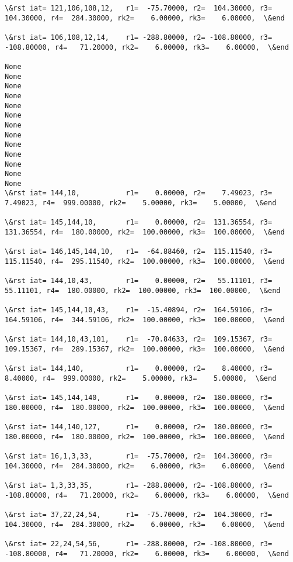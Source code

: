 \documentclass[11pt]{article}
\begin{document}
\begin{Verbatim}[commandchars=\\\{\}]
\&rst iat= 121,106,108,12,   r1=  -75.70000, r2=  104.30000, r3=  104.30000, r4=  284.30000, rk2=    6.00000, rk3=    6.00000,  \&end

\&rst iat= 106,108,12,14,    r1= -288.80000, r2= -108.80000, r3= -108.80000, r4=   71.20000, rk2=    6.00000, rk3=    6.00000,  \&end

None
None
None
None
None
None
None
None
None
None
None
None
None
\&rst iat= 144,10,           r1=    0.00000, r2=    7.49023, r3=    7.49023, r4=  999.00000, rk2=    5.00000, rk3=    5.00000,  \&end

\&rst iat= 145,144,10,       r1=    0.00000, r2=  131.36554, r3=  131.36554, r4=  180.00000, rk2=  100.00000, rk3=  100.00000,  \&end

\&rst iat= 146,145,144,10,   r1=  -64.88460, r2=  115.11540, r3=  115.11540, r4=  295.11540, rk2=  100.00000, rk3=  100.00000,  \&end

\&rst iat= 144,10,43,        r1=    0.00000, r2=   55.11101, r3=   55.11101, r4=  180.00000, rk2=  100.00000, rk3=  100.00000,  \&end

\&rst iat= 145,144,10,43,    r1=  -15.40894, r2=  164.59106, r3=  164.59106, r4=  344.59106, rk2=  100.00000, rk3=  100.00000,  \&end

\&rst iat= 144,10,43,101,    r1=  -70.84633, r2=  109.15367, r3=  109.15367, r4=  289.15367, rk2=  100.00000, rk3=  100.00000,  \&end

\&rst iat= 144,140,          r1=    0.00000, r2=    8.40000, r3=    8.40000, r4=  999.00000, rk2=    5.00000, rk3=    5.00000,  \&end

\&rst iat= 145,144,140,      r1=    0.00000, r2=  180.00000, r3=  180.00000, r4=  180.00000, rk2=  100.00000, rk3=  100.00000,  \&end

\&rst iat= 144,140,127,      r1=    0.00000, r2=  180.00000, r3=  180.00000, r4=  180.00000, rk2=  100.00000, rk3=  100.00000,  \&end

\&rst iat= 16,1,3,33,        r1=  -75.70000, r2=  104.30000, r3=  104.30000, r4=  284.30000, rk2=    6.00000, rk3=    6.00000,  \&end

\&rst iat= 1,3,33,35,        r1= -288.80000, r2= -108.80000, r3= -108.80000, r4=   71.20000, rk2=    6.00000, rk3=    6.00000,  \&end

\&rst iat= 37,22,24,54,      r1=  -75.70000, r2=  104.30000, r3=  104.30000, r4=  284.30000, rk2=    6.00000, rk3=    6.00000,  \&end

\&rst iat= 22,24,54,56,      r1= -288.80000, r2= -108.80000, r3= -108.80000, r4=   71.20000, rk2=    6.00000, rk3=    6.00000,  \&end


\end{Verbatim}
\end{document}
